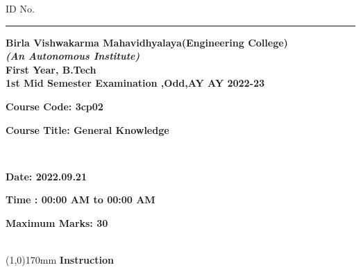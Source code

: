 \documentclass[addpoints,12pt]{exam}
\begin{document}
    \hspace{-7mm}ID No.\rule{20mm}{0.3mm}
    \begin{center}
 \textbf{Birla Vishwakarma Mahavidhyalaya(Engineering College)} \\
  \textbf{\textit{(An Autonomous Institute)}} \\
  \textbf{First Year, B.Tech} \\
  \textbf{1st Mid Semester Examination ,Odd,AY AY 2022-23} \\
  \vspace{4mm}
 
 
  \end{center}
 
  \hspace{-7mm}
  \parbox[t]{50mm}{\textbf{Course Code: 3cp02}}
  \parbox[t]{100mm}{\textbf{Course Title: General Knowledge}}\vspace{2mm}\\
  \parbox[t]{50mm}{\textbf{Date: 2022.09.21}}
  \parbox[t]{75mm}{\textbf{Time : 00:00 AM to 00:00 AM}}
  \parbox[t]{50mm}{\textbf{Maximum Marks: 30}}\\
  \line(1,0){170mm} \vspace{2mm}
  \hspace{-6mm}\textbf{Instruction}

 
\end{document}
